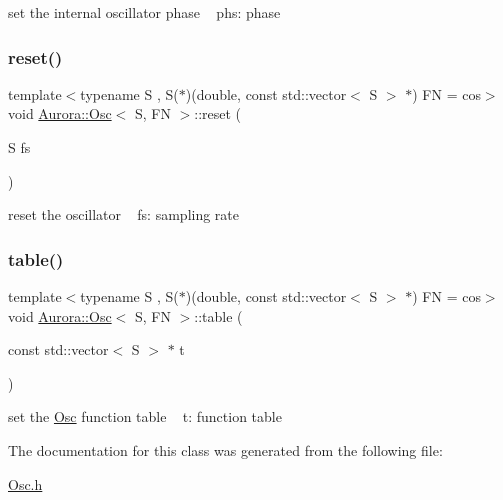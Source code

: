 set the internal oscillator phase ~\newline
phs\+: phase \mbox{\label{class_aurora_1_1_osc_a9537710c678ff70707c340343534ac58}} 
\subsubsection{\texorpdfstring{reset()}{reset()}}
{\footnotesize\ttfamily template$<$typename S , S($\ast$)(double, const std\+::vector$<$ S $>$ $\ast$) FN = cos$>$ \\
void \hyperlink{class_aurora_1_1_osc}{Aurora\+::\+Osc}$<$ S, FN $>$\+::reset (\begin{DoxyParamCaption}\item[{S}]{fs }\end{DoxyParamCaption})\hspace{0.3cm}{\ttfamily [inline]}}

reset the oscillator ~\newline
fs\+: sampling rate \mbox{\label{class_aurora_1_1_osc_af003fa84004e878179446ceaf2d0007c}} 
\subsubsection{\texorpdfstring{table()}{table()}}
{\footnotesize\ttfamily template$<$typename S , S($\ast$)(double, const std\+::vector$<$ S $>$ $\ast$) FN = cos$>$ \\
void \hyperlink{class_aurora_1_1_osc}{Aurora\+::\+Osc}$<$ S, FN $>$\+::table (\begin{DoxyParamCaption}\item[{const std\+::vector$<$ S $>$ $\ast$}]{t }\end{DoxyParamCaption})\hspace{0.3cm}{\ttfamily [inline]}}

set the \hyperlink{class_aurora_1_1_osc}{Osc} function table ~\newline
t\+: function table 

The documentation for this class was generated from the following file\+:\begin{DoxyCompactItemize}
\item 
\hyperlink{_osc_8h}{Osc.\+h}\end{DoxyCompactItemize}
